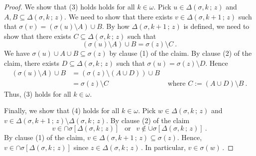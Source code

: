 \documentclass[10pt,a4paper, openany,  oldfontcommands]{memoir}
\newtheorem{open problem} [theorem] {Open Problem}
\begin{document}
\begin{proof}
We show that (3) holds   holds for all $ k   \in  \omega   $. 
Pick     $  u  \in  \Delta \left(  \sigma , k   \,  ;   \,   z  \right)   $  and    $  A,  B   \subseteq  \Delta \left(  \sigma , k   \,  ;   \,   z  \right)   $. 
We need to show that  there exists   $  v  \in    \Delta \left(  \sigma , k +1   \,  ;   \,   z  \right)    $  such that  
$  \sigma (v)  =      \left(   \sigma (u)  \setminus   A   \right)  \cup   B  $. 
By how  $   \Delta \left(  \sigma , k +1   \,  ;   \,   z  \right)      $  is defined,  
  we need to show that 
there exists  $  C  \subseteq    \Delta \left(  \sigma , k   \,  ;   \,   z  \right)   $  such that 
\[
 \left(   \sigma (u)  \setminus   A   \right)  \cup   B    =    \sigma (z)   \setminus  C
 \       .
\]
We have  $ \sigma  (u)  \cup    A  \cup  B   \subseteq   \sigma (z)  $  by clause (1) of the claim.
By clause (2) of the claim,    there exists    $  D  \subseteq      \Delta \left(  \sigma , k   \,  ;   \,   z  \right)   $  such that 
$  \sigma  (u)  =   \sigma (z)  \setminus  D  $. 
Hence 
\begin{align*}
 \left(   \sigma (u)  \setminus   A   \right)  \cup   B    
 &=  
 \left(   \sigma (z)  \setminus   \left(  A  \cup   D  \right)     \right)  \cup   B  
 \\
 &=  \sigma (z)   \setminus  C
&    \mbox{  where  }   C  :=    \left(  A  \cup   D  \right)     \setminus    B  
 \        .
\end{align*}
Thus,   (3)  holds  for all $  k  \in  \omega  $.  






Finally,    we   show that (4) holds  for all  $  k  \in  \omega  $.
Pick  $  w  \in    \Delta \left(  \sigma , k   \,  ;   \,   z  \right)    $   and     $  v  \in   \Delta \left(  \sigma , k +1  \,  ;   \,   z  \right)     \setminus    \Delta \left(  \sigma , k   \,  ;   \,   z  \right)    $. 
By clause (2) of the claim 
\[
v  \in   \cap   \sigma   \left[    \Delta \left(  \sigma , k   \,  ;   \,   z  \right)     \right]  
\      \      \mbox{  or   }      \         \   
v    \not\in   \cup   \sigma   \left[    \Delta \left(  \sigma , k   \,  ;   \,   z  \right)     \right]  
\      .
\]
By clause  (1) of the claim,  $  v  \in   \Delta \left(  \sigma , k +1  \,  ;   \,   z  \right)     \subseteq  \sigma (z)  $. 
Hence,  $  v  \in   \cap   \sigma   \left[    \Delta \left(  \sigma , k   \,  ;   \,   z  \right)     \right]    $
since  $  z  \in     \Delta \left(  \sigma , k   \,  ;   \,   z  \right)           \,     $. 
In particular,    $  v   \in  \sigma (w)        \,    $. 






\end{proof}
\end{document}
